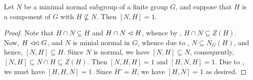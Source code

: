\begin{lemma}
    Let $N$ be a minimal normal subgroup of a finite group $G$, and suppose that $H$ is a component of $G$ with $H\not\subseteq N$. Then $[N, H] = 1$.
\end{lemma}
\begin{proof}
    Note that $H\cap N\subsetneq H$ and $H\cap N\vartriangleleft H$, whence by , $H\cap N\subseteq Z(H)$. Now, $H\vartriangleleft\!\vartriangleleft G$, and $N$ is minial normal in $G$, whence due to , $N\subseteq N_G(H)$, and hence, $[N, H]\subseteq H$. Since $N$ is normal, we have $[N, H]\subseteq N$, consequently, $[N, H]\subseteq N\cap H\subseteq Z(H)$. Then $[N, H, H] = 1$ and $[H, N, H] = 1$. Due to , we must have $[H, H, N] = 1$. Since $H' = H$, we have $[H, N] = 1$ as desired.
\end{proof}

